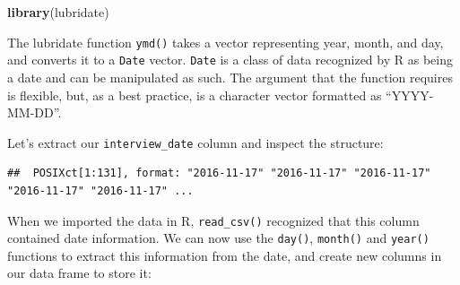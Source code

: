 \documentclass[]{book}
\newenvironment{Shaded}{\begin{snugshade}}{\end{snugshade}}
\newcommand{\KeywordTok}[1]{\textcolor[rgb]{0.13,0.29,0.53}{\textbf{#1}}}
\newcommand{\StringTok}[1]{\textcolor[rgb]{0.31,0.60,0.02}{#1}}
\newcommand{\OperatorTok}[1]{\textcolor[rgb]{0.81,0.36,0.00}{\textbf{#1}}}
\newcommand{\NormalTok}[1]{#1}
\begin{document}
\begin{Shaded}
\begin{Highlighting}[]
\KeywordTok{library}\NormalTok{(lubridate)}
\end{Highlighting}
\end{Shaded}

The lubridate function \texttt{ymd()} takes a vector representing year,
month, and day, and converts it to a \texttt{Date} vector. \texttt{Date}
is a class of data recognized by R as being a date and can be
manipulated as such. The argument that the function requires is
flexible, but, as a best practice, is a character vector formatted as
``YYYY-MM-DD''.

Let's extract our \texttt{interview\_date} column and inspect the
structure:

\begin{Shaded}
\end{Shaded}

\begin{verbatim}
##  POSIXct[1:131], format: "2016-11-17" "2016-11-17" "2016-11-17" "2016-11-17" "2016-11-17" ...
\end{verbatim}

When we imported the data in R, \texttt{read\_csv()} recognized that
this column contained date information. We can now use the
\texttt{day()}, \texttt{month()} and \texttt{year()} functions to
extract this information from the date, and create new columns in our
data frame to store it:

\begin{Shaded}
\end{Shaded}
\end{document}
